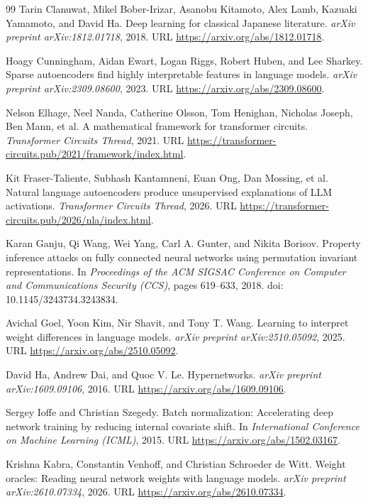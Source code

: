 \documentclass[11pt]{article}
\begin{document}
\begin{thebibliography}{99}
 Tarin Clanuwat, Mikel Bober-Irizar, Asanobu Kitamoto, Alex Lamb, Kazuaki Yamamoto, and David Ha. Deep learning for classical Japanese literature. \emph{arXiv preprint arXiv:1812.01718}, 2018. URL \url{https://arxiv.org/abs/1812.01718}.

 Hoagy Cunningham, Aidan Ewart, Logan Riggs, Robert Huben, and Lee Sharkey. Sparse autoencoders find highly interpretable features in language models. \emph{arXiv preprint arXiv:2309.08600}, 2023. URL \url{https://arxiv.org/abs/2309.08600}.

 Nelson Elhage, Neel Nanda, Catherine Olsson, Tom Henighan, Nicholas Joseph, Ben Mann, et al. A mathematical framework for transformer circuits. \emph{Transformer Circuits Thread}, 2021. URL \url{https://transformer-circuits.pub/2021/framework/index.html}.

 Kit Fraser-Taliente, Subhash Kantamneni, Euan Ong, Dan Mossing, et al. Natural language autoencoders produce unsupervised explanations of LLM activations. \emph{Transformer Circuits Thread}, 2026. URL \url{https://transformer-circuits.pub/2026/nla/index.html}.

 Karan Ganju, Qi Wang, Wei Yang, Carl A. Gunter, and Nikita Borisov. Property inference attacks on fully connected neural networks using permutation invariant representations. In \emph{Proceedings of the ACM SIGSAC Conference on Computer and Communications Security (CCS)}, pages 619--633, 2018. doi: 10.1145/3243734.3243834.

 Avichal Goel, Yoon Kim, Nir Shavit, and Tony T. Wang. Learning to interpret weight differences in language models. \emph{arXiv preprint arXiv:2510.05092}, 2025. URL \url{https://arxiv.org/abs/2510.05092}.

 David Ha, Andrew Dai, and Quoc V. Le. Hypernetworks. \emph{arXiv preprint arXiv:1609.09106}, 2016. URL \url{https://arxiv.org/abs/1609.09106}.

 Sergey Ioffe and Christian Szegedy. Batch normalization: Accelerating deep network training by reducing internal covariate shift. In \emph{International Conference on Machine Learning (ICML)}, 2015. URL \url{https://arxiv.org/abs/1502.03167}.

 Krishna Kabra, Constantin Venhoff, and Christian Schroeder de Witt. Weight oracles: Reading neural network weights with language models. \emph{arXiv preprint arXiv:2610.07334}, 2026. URL \url{https://arxiv.org/abs/2610.07334}.


\end{thebibliography}
\end{document}
